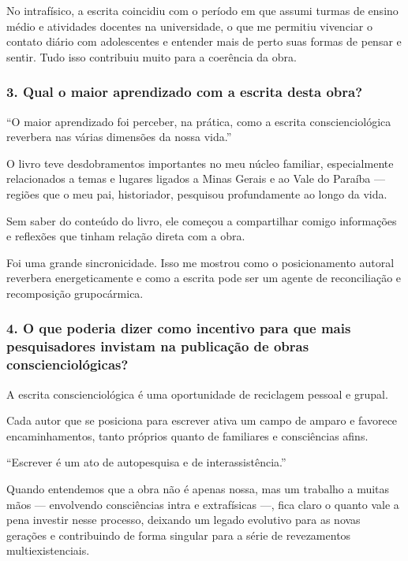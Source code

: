 \documentclass{gescons}
\begin{document}
\begin{multicols}{3}
No intrafísico, a escrita coincidiu com o período em que assumi turmas de ensino médio e atividades docentes na universidade, o que me permitiu vivenciar o contato diário com adolescentes e entender mais de perto suas formas de pensar e sentir. Tudo isso contribuiu muito para a coerência da obra.

\subsubsection{3. Qual o maior aprendizado com a escrita desta obra?}

\begin{pullquote}
``O maior aprendizado foi perceber, na prática, como a escrita conscienciológica reverbera nas várias dimensões da nossa vida.''
\end{pullquote}

O livro teve desdobramentos importantes no meu núcleo familiar, especialmente relacionados a temas e lugares ligados a Minas Gerais e ao Vale do Paraíba --- regiões que o meu pai, historiador, pesquisou profundamente ao longo da vida.

Sem saber do conteúdo do livro, ele começou a compartilhar comigo informações e reflexões que tinham relação direta com a obra.

Foi uma grande sincronicidade. Isso me mostrou como o posicionamento autoral reverbera energeticamente e como a escrita pode ser um agente de reconciliação e recomposição grupocármica.

\subsubsection{4. O que poderia dizer como incentivo para que mais pesquisadores invistam na publicação de obras conscienciológicas?}

A escrita conscienciológica é uma oportunidade de reciclagem pessoal e grupal.

Cada autor que se posiciona para escrever ativa um campo de amparo e favorece encaminhamentos, tanto próprios quanto de familiares e consciências afins.

\begin{pullquote}
``Escrever é um ato de autopesquisa e de interassistência.''
\end{pullquote}

Quando entendemos que a obra não é apenas nossa, mas um trabalho a muitas mãos --- envolvendo consciências intra e extrafísicas ---, fica claro o quanto vale a pena investir nesse processo, deixando um legado evolutivo para as novas gerações e contribuindo de forma singular para a série de revezamentos multiexistenciais.

    
    \end{multicols}
\end{document}
